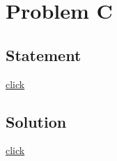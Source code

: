 \section{Problem C}
    \subsection{Statement}
        {\color{blue} \href{http://hsin.hr/coci/archive/2006_2007/contest1_tasks.pdf}{click}}

    \subsection{Solution}
        {\color{blue} \href{http://hsin.hr/coci/archive/2006_2007/contest1_solutions.zip}{click}}
